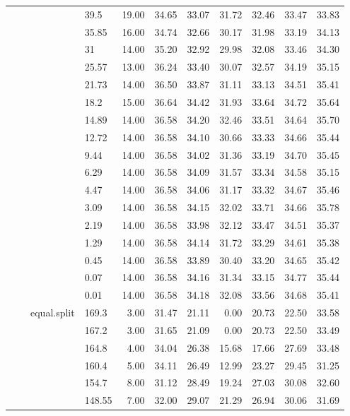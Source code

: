 \begin{longtable}{llllrrrrrrr}
   &  &  & 39.5 & 19.00 & 34.65 & 33.07 & 31.72 & 32.46 & 33.47 & 33.83 \\ 
   &  &  & 35.85 & 16.00 & 34.74 & 32.66 & 30.17 & 31.98 & 33.19 & 34.13 \\ 
   &  &  & 31 & 14.00 & 35.20 & 32.92 & 29.98 & 32.08 & 33.46 & 34.30 \\ 
   &  &  & 25.57 & 13.00 & 36.24 & 33.40 & 30.07 & 32.57 & 34.19 & 35.15 \\ 
   &  &  & 21.73 & 14.00 & 36.50 & 33.87 & 31.11 & 33.13 & 34.51 & 35.41 \\ 
   &  &  & 18.2 & 15.00 & 36.64 & 34.42 & 31.93 & 33.64 & 34.72 & 35.64 \\ 
   &  &  & 14.89 & 14.00 & 36.58 & 34.20 & 32.46 & 33.51 & 34.64 & 35.70 \\ 
   &  &  & 12.72 & 14.00 & 36.58 & 34.10 & 30.66 & 33.33 & 34.66 & 35.44 \\ 
   &  &  & 9.44 & 14.00 & 36.58 & 34.02 & 31.36 & 33.19 & 34.70 & 35.45 \\ 
   &  &  & 6.29 & 14.00 & 36.58 & 34.09 & 31.57 & 33.34 & 34.58 & 35.15 \\ 
   &  &  & 4.47 & 14.00 & 36.58 & 34.06 & 31.17 & 33.32 & 34.67 & 35.46 \\ 
   &  &  & 3.09 & 14.00 & 36.58 & 34.15 & 32.02 & 33.71 & 34.66 & 35.78 \\ 
   &  &  & 2.19 & 14.00 & 36.58 & 33.98 & 32.12 & 33.47 & 34.51 & 35.37 \\ 
   &  &  & 1.29 & 14.00 & 36.58 & 34.14 & 31.72 & 33.29 & 34.61 & 35.38 \\ 
   &  &  & 0.45 & 14.00 & 36.58 & 33.89 & 30.40 & 33.20 & 34.65 & 35.42 \\ 
   &  &  & 0.07 & 14.00 & 36.58 & 34.16 & 31.34 & 33.15 & 34.77 & 35.44 \\ 
   &  &  & 0.01 & 14.00 & 36.58 & 34.18 & 32.08 & 33.56 & 34.68 & 35.41 \\ 
   &  & equal.split & 169.3 & 3.00 & 31.47 & 21.11 & 0.00 & 20.73 & 22.50 & 33.58 \\ 
   &  &  & 167.2 & 3.00 & 31.65 & 21.09 & 0.00 & 20.73 & 22.50 & 33.49 \\ 
   &  &  & 164.8 & 4.00 & 34.04 & 26.38 & 15.68 & 17.66 & 27.69 & 33.48 \\ 
   &  &  & 160.4 & 5.00 & 34.11 & 26.49 & 12.99 & 23.27 & 29.45 & 31.25 \\ 
   &  &  & 154.7 & 8.00 & 31.12 & 28.49 & 19.24 & 27.03 & 30.08 & 32.60 \\ 
   &  &  & 148.55 & 7.00 & 32.00 & 29.07 & 21.29 & 26.94 & 30.06 & 31.69 \\ 

\end{longtable}
